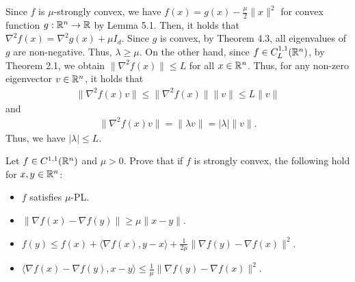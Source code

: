 \documentclass{ExerciseSheet}
\newif\ifsolutions
\begin{document}
\begin{solution}
    Since $f$ is $\mu$-strongly convex, we have $f(x)=g(x)-\frac{\mu}{2}\lVert x\rVert^2$ for convex function $g:\mathbb{R}^n \rightarrow \mathbb{R}$ by Lemma 5.1. Then, it holds that $\nabla ^2 f(x) = \nabla^2 g(x)+\mu I_d$. Since $g$ is convex, by Theorem 4.3, all eigenvalues of $g$ are non-negative. Thus, $\lambda \geq \mu$. On the other hand, since $f\in C^{1,1}_L(\mathbb{R}^n)$, by Theorem 2.1, we obtain $\lVert\nabla^2 f(x)\rVert \leq L$ for all $x\in\mathbb{R}^n$. Thus, for any non-zero eigenvector $v\in\mathbb{R}^n$, it holds that
    \begin{align*}
        \lVert\nabla^2 f(x)v\rVert\leq \lVert\nabla^2 f(x)\rVert\lVert v\rVert \leq L \lVert v\rVert
    \end{align*}
    and 
    \begin{align*}
        \lVert\nabla^2 f(x)v\rVert = \lVert \lambda v \rVert = |\lambda | \lVert v\rVert.
    \end{align*}
    Thus, we have $|\lambda | \leq L$.
\end{solution}

\fi

\vskip 0.5cm
\begin{problem}[Lemma 6.2]
    Let $f\in C^{1,1}(\mathbb{R}^n)$ and $\mu>0$. Prove that if $f$ is strongly convex, the following hold for $x,y \in \mathbb{R}^n$:
    \begin{itemize}
        \item $f$ satisfies $\mu$-PL.
        \item $\lVert \nabla f(x)-\nabla f(y)\rVert\geq \mu \lVert x-y\rVert$.
        \item $f(y)\leq f(x)+\langle \nabla f(x), y-x\rangle +\frac{1}{2\mu}\lVert  \nabla f(y)- \nabla f(x)\rVert^2$.
        \item $\langle \nabla f(x)-\nabla f(y),x-y \rangle \leq \frac{1}{\mu}\lVert  \nabla f(y)- \nabla f(x)\rVert^2.$
    \end{itemize}
\end{problem}
\ifsolutions
\vskip 0.3cm
\end{document}
